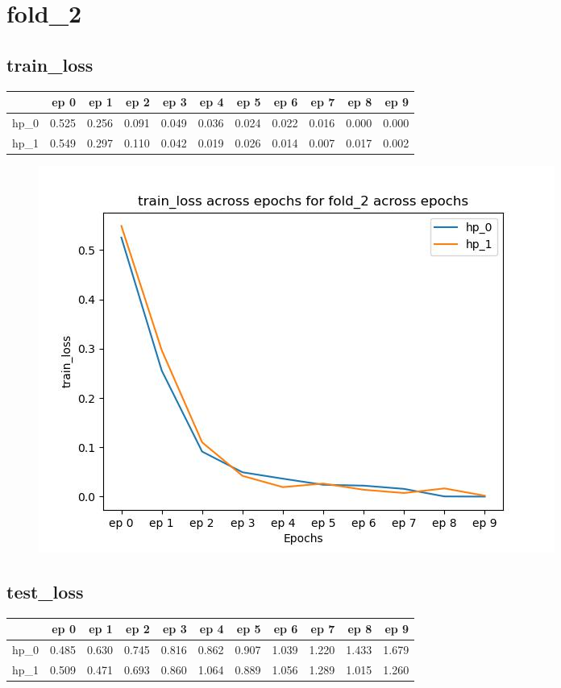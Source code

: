 \documentclass{article}
\begin{document}
\section{fold\_2}
\subsection{train\_loss}
\begin{tabular}{lrrrrrrrrrr}
\toprule
{} &   ep 0 &   ep 1 &   ep 2 &   ep 3 &   ep 4 &   ep 5 &   ep 6 &   ep 7 &   ep 8 &   ep 9 \\
\midrule
hp\_0 &  0.525 &  0.256 &  0.091 &  0.049 &  0.036 &  0.024 &  0.022 &  0.016 &  0.000 &  0.000 \\
hp\_1 &  0.549 &  0.297 &  0.110 &  0.042 &  0.019 &  0.026 &  0.014 &  0.007 &  0.017 &  0.002 \\
\bottomrule
\end{tabular}

\begin{figure}[H]
\includegraphics[scale = 0.75]{fold_2/train_loss}
\end{figure}
\subsection{test\_loss}
\begin{tabular}{lrrrrrrrrrr}
\toprule
{} &   ep 0 &   ep 1 &   ep 2 &   ep 3 &   ep 4 &   ep 5 &   ep 6 &   ep 7 &   ep 8 &   ep 9 \\
\midrule
hp\_0 &  0.485 &  0.630 &  0.745 &  0.816 &  0.862 &  0.907 &  1.039 &  1.220 &  1.433 &  1.679 \\
hp\_1 &  0.509 &  0.471 &  0.693 &  0.860 &  1.064 &  0.889 &  1.056 &  1.289 &  1.015 &  1.260 \\
\bottomrule
\end{tabular}
\end{document}
